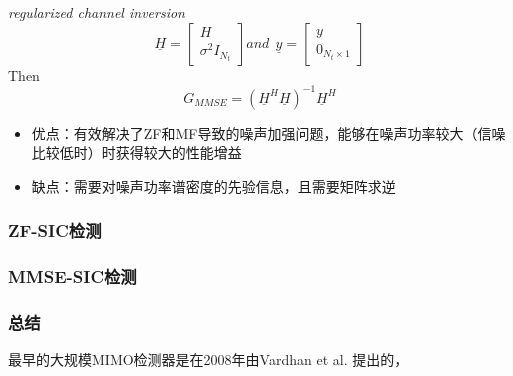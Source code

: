 \emph{regularized channel inversion}
\begin{equation}
    \underline{H}=\begin{bmatrix}
        H \\
        \sigma^2I_{N_t}
        \end{bmatrix} and  \ \ 
        \underline{y}=
        \begin{bmatrix}
        y \\
        0_{N_t\times1}
        \end{bmatrix} 
\end{equation}
Then
\begin{equation}
    G_{MMSE}=(\underline{H}^H\underline{H})^{-1}\underline{H}^H
\end{equation}
\begin{itemize}
    \item 优点：有效解决了ZF和MF导致的噪声加强问题，能够在噪声功率较大（信噪比较低时）时获得较大的性能增益
    \item 缺点：需要对噪声功率谱密度的先验信息，且需要矩阵求逆
\end{itemize}

\subsubsection{ZF-SIC检测}

\subsubsection{MMSE-SIC检测}
\subsubsection{总结}
最早的大规模MIMO检测器是在2008年由Vardhan et al. 提出的，


